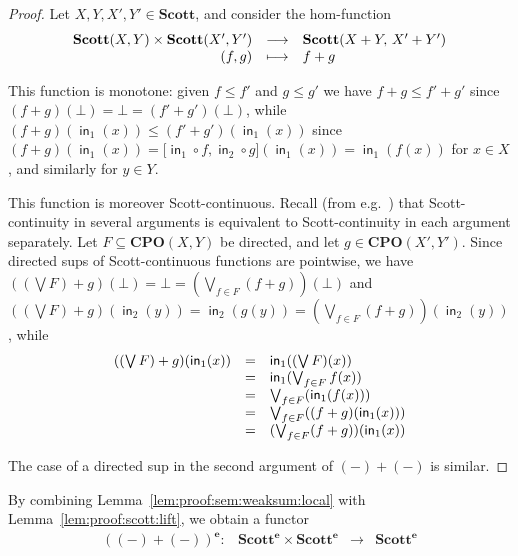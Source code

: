 \documentclass[%
  a4paper,
  UKenglish,
  cleveref,
  autoref,
  thm-restate,
  numberwithinsect,
]{lipics-v2021}
\newcommand\sle\subseteq
\newcommand\longto\longrightarrow
\newcommand\pl{\mathord{-}}	%
\newcommand\copair[1]{{\lbrack #1 \rbrack}}
\newcommand\comp{\mathbin\circ}
\newcommand\CPO{\mathbf{CPO}}
\newcommand\Scott{\mathbf{Scott}}
\newcommand\term[1]{\mathsf{#1}}
\newcommand\inj{\mathop{\term{in}}}
\newcommand\ep{{\mathbf{e}}}
\begin{document}
\begin{proof}
Let $X,Y,X',Y' \in \Scott$,
and consider the hom-function
\[
\begin{array}{r c l}
  \Scott(X,Y) \times \Scott(X',Y')
& \longto
& \Scott(X+Y,\, X' + Y')
\\
%
  (f,g)
& \longmapsto
& f + g
\end{array}
\]

This function is monotone: given $f \leq f'$ and $g \leq g'$
we have
$f+g \leq f' + g'$
since
\(
  (f + g)(\bot)
  =
  \bot
  =
  (f' + g')(\bot)
\),
while 
\(
  (f + g)(\inj_1(x))
  \leq
  (f' + g')(\inj_1(x))
\)
since
\(
  (f + g)(\inj_1(x))
  =
  \copair{{\inj_1} \comp f, {\inj_2} \comp g}(\inj_1(x))
  =
  \inj_1(f(x))
\)
for $x \in X$,
and similarly for $y \in Y$.

This function is moreover Scott-continuous.
Recall (from e.g.~\cite[Proposition 1.4.3]{ac98book})
that Scott-continuity in several arguments is equivalent
to Scott-continuity in each argument separately.
Let $F \sle \CPO(X,Y)$ be directed, and let $g \in \CPO(X',Y')$.
Since directed sups of Scott-continuous functions are pointwise,
we have $((\bigvee F) + g)(\bot) = \bot = (\bigvee_{f \in F}(f+g))(\bot)$
and
$((\bigvee F) + g)(\inj_2(y)) = \inj_2(g(y)) = (\bigvee_{f \in F}(f+g))(\inj_2(y))$,
while
\[
\begin{array}{l l l}
  ((\bigvee F) + g)(\inj_1(x))
& =
& \inj_1((\bigvee F)(x))
\\
%
& =
& \inj_1(\bigvee_{f \in F}f(x))
\\
%
& =
& \bigvee_{f \in F}(\inj_1(f(x)))
\\
%
& =
& \bigvee_{f \in F}((f+g)(\inj_1(x)))
\\
%
& =
& (\bigvee_{f \in F}(f+g))(\inj_1(x))
\end{array}
\]

The case of a directed sup in the second argument of $(\pl) + (\pl)$
is similar.
\end{proof}

By combining Lemma~\ref{lem:proof:sem:weaksum:local}
with Lemma~\ref{lem:proof:scott:lift},
we obtain a functor
\[
\begin{array}{*{4}{l}}
  \left( (\pl) + (\pl) \right)^\ep
  \colon
& \Scott^\ep \times \Scott^\ep
& \longto
& \Scott^\ep
\end{array}
\]
\end{document}
